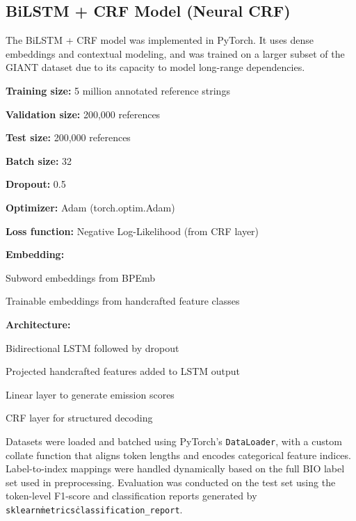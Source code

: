 \subsection{BiLSTM + CRF Model (Neural CRF)}
The BiLSTM + CRF model was implemented in PyTorch. It uses dense embeddings and contextual modeling, and was trained on a larger subset of the GIANT dataset due to its capacity to model long-range dependencies.
\begin{compactitem}
\item \textbf{Training size:} 5 million annotated reference strings
\item \textbf{Validation size:} 200,000 references
\item \textbf{Test size:} 200,000 references
\item \textbf{Batch size:} 32
\item \textbf{Dropout:} 0.5
\item \textbf{Optimizer:} Adam (torch.optim.Adam)
\item \textbf{Loss function:} Negative Log-Likelihood (from CRF layer)
\item \textbf{Embedding:}
\begin{compactitem}
\item Subword embeddings from BPEmb
\item Trainable embeddings from handcrafted feature classes
\end{compactitem}
\item \textbf{Architecture:}
\begin{compactitem}
\item Bidirectional LSTM followed by dropout
\item Projected handcrafted features added to LSTM output
\item Linear layer to generate emission scores
\item CRF layer for structured decoding
\end{compactitem}
\end{compactitem}

Datasets were loaded and batched using PyTorch's \texttt{DataLoader}, with a custom collate function that aligns token lengths and encodes categorical feature indices. Label-to-index mappings were handled dynamically based on the full BIO label set used in preprocessing.
Evaluation was conducted on the test set using the token-level F1-score and classification reports generated by \texttt{sklearn\.metrics\.classification\_report}.
